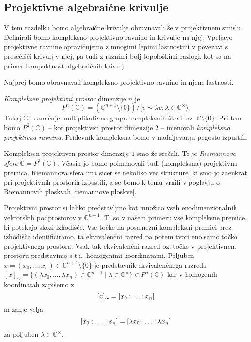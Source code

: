 \documentclass[mat1]{fmfdelo}
\newcommand{\C}{\mathbb C}
\newcommand{\CM}{\mathbb C ^\times}
\newcommand{\PC}{P^2(\mathbb C)}
\newcommand{\pcoor}[1]{%
  \begingroup\lccode`~=`: \lowercase{\endgroup
  \edef~}{\mathbin{\mathchar\the\mathcode`:}\nobreak}%
  [%
  \begingroup
  \mathcode`:=\string"8000
  #1%
  \endgroup
  ]%
}
\theoremstyle{definition}
\begin{document}
 

\subsection{Projektivne algebraične krivulje}

V tem razdelku bomo algebraične krivulje obravnavali še v projektivnem smislu. Definirali bomo kompleksno projektivno ravnino in krivulje na njej. Vpeljavo projektivne ravnine opravičujemo z mnogimi lepimi lastnostmi v povezavi s presečišči krivulj v njej, pa tudi z raznimi bolj topološkimi razlogi, kot so na primer kompaktnost algebraičnih krivulj.

Najprej bomo obravnavali kompleksno projektivno ravnino in njene lastnosti. 
\begin{definicija}
    \emph{Kompleksen projektivni prostor} dimenzije $n$ je 
    \[
        P^n(\C) = (\C^{n+1} \setminus \{0 \}) / \langle v \sim \lambda v; \lambda \in \C^{\times} \rangle.
    \]
    Tukaj $\C^{\times}$ označuje multiplikativno grupo kompleksnih števil oz. $\C \setminus \{0 \}$. 
    Pri tem bomo $\PC$ -- kot projektiven prostor dimenzije $2$ -- imenovali \emph{kompleksna projektivna ravnina}. Pridevnik kompleksna bomo v nadaljevanju pogosto izpustili.
\end{definicija}

\begin{primer*}
    Kompleksen projektiven prostor dimenzije $1$ smo že srečali. To je \emph{Riemannova sfera} $\widehat{\C} = P^1(\C)$. Včasih jo bomo poimenovali tudi (kompleksna) projektivna premica. Riemannova sfera ima sicer še nekoliko več strukture, ki smo jo zaenkrat pri projektivnih prostorih izpustili, a se bomo k temu vrnili v poglavju o Riemannovih ploskvah \ref{riemannove ploskve}.
\end{primer*}

Projektivni prostor si lahko predstavljmo kot množico vseh enodimenzionalnih vektorskih podprostorov v $\C^{n+1}$. Ti so v našem primeru vse kompleksne premice, ki potekajo skozi izhodišče. Vse točke na posamezni kompleksni premici brez izhodišča identificiramo, ta ekvivalenčni razred pa potem tvori eno samo točko projektivnega prostora. Vsak tak ekvivalenčni razred oz. točko v projektivnem prostoru predstavimo s t.i.\ homogenimi koordinatami. Poljuben $x = (x_0, \dots, x_n) \in \C^{n+1}\setminus \{0\}$ je predstavnik ekvivalenčnega razreda $[x]_\sim = \{(\lambda x_0, \dots, \lambda x_n) \in \C^{n+1} \mid \lambda \in \CM\} \in P^n(\C)$ kar v homogenih koordinatah zapišemo z
    \[
        [x]_\sim = \pcoor{x_0 : \ldots : x_n}
    \]
in zanje velja
    \[
        [x_0: \ldots: x_n] = \pcoor{\lambda x_0: \ldots: \lambda x_n}
    \]
za poljuben $\lambda \in \CM$.
\end{document}
